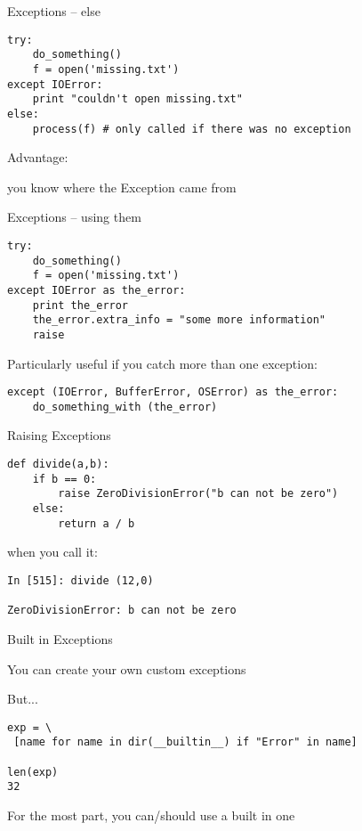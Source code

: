 \documentclass{beamer}
\begin{document}
\begin{frame}[fragile]{Exceptions -- else }

\vfill
\begin{verbatim}
try:
    do_something()
    f = open('missing.txt')
except IOError:
    print "couldn't open missing.txt"
else:
    process(f) # only called if there was no exception
\end{verbatim}
\vfill
{\Large Advantage:

you know where the Exception came from}
\end{frame}

\begin{frame}[fragile]{Exceptions -- using them }

\vfill
\begin{verbatim}
try:
    do_something()
    f = open('missing.txt')
except IOError as the_error:
    print the_error
    the_error.extra_info = "some more information"
    raise
\end{verbatim}

{\Large Particularly useful if you catch more than one exception:}

\begin{verbatim}
except (IOError, BufferError, OSError) as the_error:
    do_something_with (the_error)
\end{verbatim}

\end{frame}


\begin{frame}[fragile]{Raising Exceptions }

\begin{verbatim}
def divide(a,b):
    if b == 0:
        raise ZeroDivisionError("b can not be zero")
    else:
        return a / b
\end{verbatim}
\vfill
{\Large when you call it: }
\vfill
\begin{verbatim}
In [515]: divide (12,0)

ZeroDivisionError: b can not be zero
\end{verbatim}

\end{frame}



\begin{frame}[fragile]{Built in Exceptions}

{\Large You can create your own custom exceptions}

{\Large But...}

\begin{verbatim}
exp = \
 [name for name in dir(__builtin__) if "Error" in name]

len(exp)
32
\end{verbatim}

{\Large For the most part, you can/should use a built in one}

\end{frame}
\end{document}
